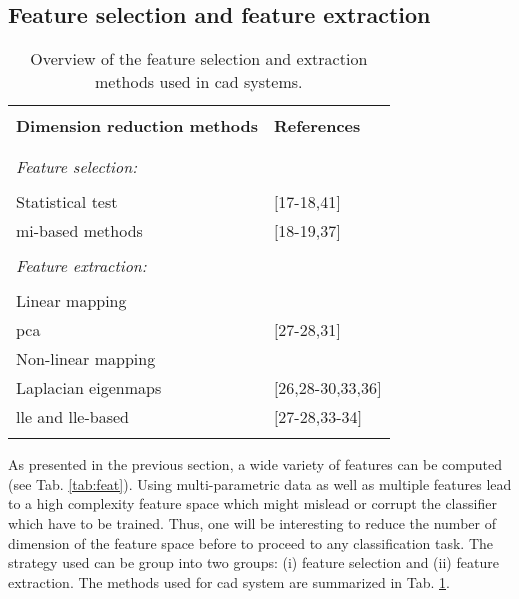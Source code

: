 \subsection{Feature selection and feature extraction} \label{subsec:featureselectionextraction}

\begin{table}
	\caption{Overview of the feature selection and extraction methods used in \ac{cad} systems.}
	\small
	\begin{tabular}{p{.65\linewidth} p{.25\linewidth}}
		\hline \\ [-1.5ex]
		\textbf{Dimension reduction methods} & \textbf{References} \\ \\ [-1.5ex]
		\hline \\ [-1.5ex]
		\textit{Feature selection:} & \\ \\ [-1.5ex]
		\quad Statistical test & $[$17-18,41$]$ \\
		\quad \ac{mi}-based methods & $[$18-19,37$]$ \\ \\ [-1.5ex]
		\textit{Feature extraction:} & \\ \\ [-1.5ex]
		\quad Linear mapping & \\
		\quad \quad \acs{pca} & $[$27-28,31$]$ \\
		\quad Non-linear mapping & \\
		\quad \quad Laplacian eigenmaps & $[$26,28-30,33,36$]$ \\
		\quad \quad \acs{lle} and \acs{lle}-based & $[$27-28,33-34$]$ \\ \\ [-1.5ex]
		\hline
	\end{tabular}
	\label{tab:featext}
\end{table}

As presented in the previous section, a wide variety of features can be computed (see Tab. \ref{tab:feat}). Using multi-parametric data as well as multiple features lead to a high complexity feature space which might mislead or corrupt the classifier which have to be trained. Thus, one will be interesting to reduce the number of dimension of the feature space before to proceed to any classification task. The strategy used can be group into two groups: (i) feature selection and (ii) feature extraction. The methods used for \ac{cad} system are summarized in Tab. \ref{tab:featext}.

